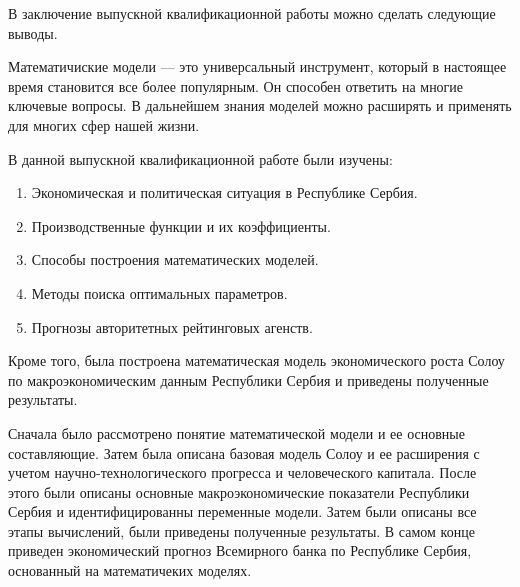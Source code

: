 \Conclusion

В заключение выпускной квалификационной работы можно сделать следующие выводы.

Математичиские модели --- это универсальный инструмент, который в настоящее время становится все более популярным.
Он способен ответить на многие ключевые вопросы.
В дальнейшем знания моделей можно расширять и применять для многих сфер нашей жизни.


В данной выпускной квалификационной работе были изучены:
\begin{enumerate}
	\item Экономическая и политическая ситуация в Республике Сербия.
	\item Производственные функции и их коэффициенты.
	\item Способы построения математических моделей.
	\item Методы поиска оптимальных параметров.
	\item Прогнозы авторитетных рейтинговых агенств.
\end{enumerate}

Кроме того, была построена математическая модель экономического роста Солоу по макроэкономическим данным Республики Сербия и приведены полученные результаты.

Сначала было рассмотрено понятие математической модели и ее основные составляющие.
Затем была описана базовая модель Солоу и ее расширения с учетом научно-технологического прогресса и человеческого капитала.
После этого были описаны основные макроэкономические показатели Республики Сербия и идентифицированны переменные модели.
Затем были описаны все этапы вычислений, были приведены полученные результаты.
В самом конце приведен экономический прогноз Всемирного банка по Республике Сербия, основанный на математичеких моделях.
